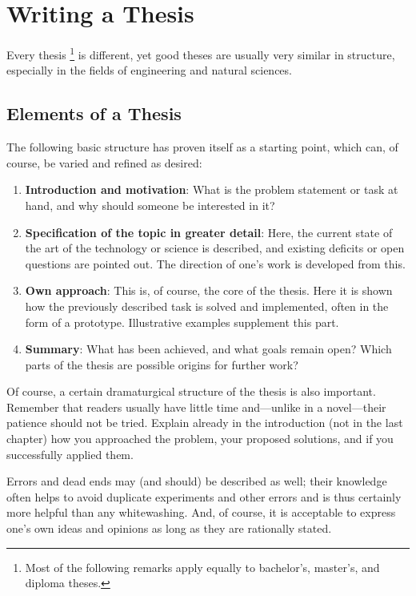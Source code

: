 \chapter{Writing a Thesis}
\label{cha:TheThesis}

Every thesis%
\footnote{Most of the following remarks apply equally to bachelor's, master's,
and diploma theses.}
is different, yet good theses are usually very similar in structure, especially
in the fields of engineering and natural sciences.

\section{Elements of a Thesis}

The following basic structure has proven itself as a starting point, which can,
of course, be varied and refined as desired:
%
\begin{enumerate}
	\item \textbf{Introduction and motivation}: What is the problem statement or
	task at hand, and why should someone be interested in it?
	\item \textbf{Specification of the topic in greater detail}: Here, the
	current state of the art of the technology or science is described, and
	existing deficits or open questions are pointed out. The direction of one's
	work is developed from this.
	\item \textbf{Own approach}: This is, of course, the core of the thesis.
	Here it is shown how the previously described task is solved and
	implemented, often in the form of a prototype. Illustrative examples
	supplement this part.
	\item \textbf{Summary}: What has been achieved, and what goals remain open?
	Which parts of the thesis are possible origins for further work?
\end{enumerate}
%
Of course, a certain dramaturgical structure of the thesis is also important.
Remember that readers usually have little time and---unlike in a novel---their
patience should not be tried. Explain already in the introduction (not in the
last chapter) how you approached the problem, your proposed solutions, and if
you successfully applied them.

Errors and dead ends may (and should) be described as well; their knowledge
often helps to avoid duplicate experiments and other errors and is thus
certainly more helpful than any whitewashing. And, of course, it is acceptable
to express one's own ideas and opinions as long as they are rationally stated.


